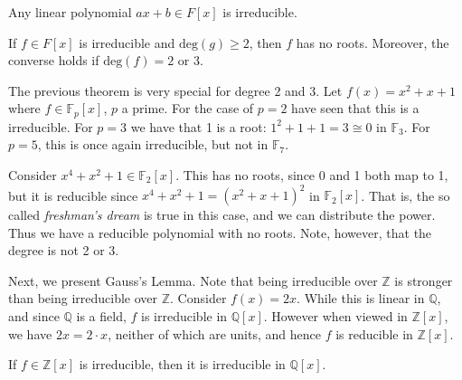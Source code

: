         \begin{theorem}
            Any linear polynomial $ax+b\in{F}[x]$ is irreducible.
        \end{theorem}
        \begin{theorem}
            If $f\in{F}[x]$ is irreducible and $\textrm{deg}(g)\geq{2}$,
            then $f$ has no roots. Moreover, the converse holds if
            $\textrm{deg}(f)=2$ or 3.
        \end{theorem}
        \begin{example}
            The previous theorem is very special for degree 2 and 3. Let
            $f(x)=x^{2}+x+1$ where $f\in\mathbb{F}_{p}[x]$, $p$ a prime.
            For the case of $p=2$ have seen that this is a irreducible. For
            $p=3$ we have that 1 is a root: $1^{2}+1+1=3\cong{0}$ in
            $\mathbb{F}_{3}$. For $p=5$, this is once again irreducible,
            but not in $\mathbb{F}_{7}$.
        \end{example}
        \begin{example}
            Consider $x^{4}+x^{2}+1\in\mathbb{F}_{2}[x]$. This has no roots,
            since 0 and 1 both map to 1, but it is reducible since
            $x^{4}+x^{2}+1=(x^{2}+x+1)^{2}$ in $\mathbb{F}_{2}[x]$. That is,
            the so called \textit{freshman's dream} is true in this case, and
            we can distribute the power. Thus we have a reducible polynomial
            with no roots. Note, however, that the degree is not 2 or 3.
        \end{example}
        Next, we present Gauss's Lemma. Note that being irreducible over
        $\mathbb{Z}$ is stronger than being irreducible over $\mathbb{Z}$.
        Consider $f(x)=2x$. While this is linear in $\mathbb{Q}$, and since
        $\mathbb{Q}$ is a field, $f$ is irreducible in $\mathbb{Q}[x]$. However
        when viewed in $\mathbb{Z}[x]$, we have $2x=2\cdot{x}$, neither of
        which are units, and hence $f$ is reducible in $\mathbb{Z}[x]$.
        \begin{theorem}
            If $f\in\mathbb{Z}[x]$ is irreducible, then it is irreducible in
            $\mathbb{Q}[x]$.
        \end{theorem}
